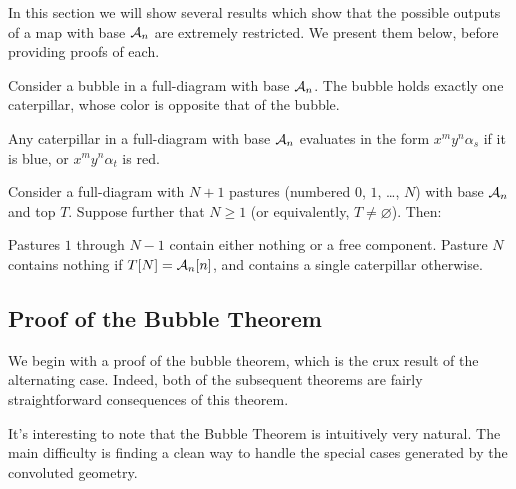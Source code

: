 In this section we will show several results which show that the possible outputs of a map with base $\AA_n$ are extremely restricted.  We present them below, before providing proofs of each.
\begin{theorem}
	Consider a bubble in a full-diagram with base $\AA_n$.  The bubble holds exactly one caterpillar, whose color is opposite that of the bubble.
	\label{thm:bubble}
\end{theorem}
\begin{theorem}
	Any caterpillar in a full-diagram with base $\AA_n$ evaluates in the form $x^my^n\alpha_s$ if it is blue, or $x^my^n\alpha_t$ is red.
	\label{thm:caterpillar}
\end{theorem}
\begin{theorem}
	Consider a full-diagram with $N+1$ pastures (numbered $0$, $1$, \dots, $N$) with base $\AA_n$ and top $T$.  Suppose further that $N \ge 1$ (or equivalently, $T \neq \varnothing$).  Then:
	\begin{enumerate}[(i)]
		\ii Pastures $1$ through $N-1$ contain either nothing or a free component.
		\ii Pasture $N$ contains nothing if $T[N] = \AA_n[n]$, and contains a single caterpillar otherwise.
	\end{enumerate}
	\label{thm:pasture}
\end{theorem}

\subsection{Proof of the Bubble Theorem}
We begin with a proof of the bubble theorem, which is the crux result of the alternating case.  Indeed, both of the subsequent theorems are fairly straightforward consequences of this theorem.

It's interesting to note that the Bubble Theorem is intuitively very natural.  The main difficulty is finding a clean way to handle the special cases generated by the convoluted geometry.

